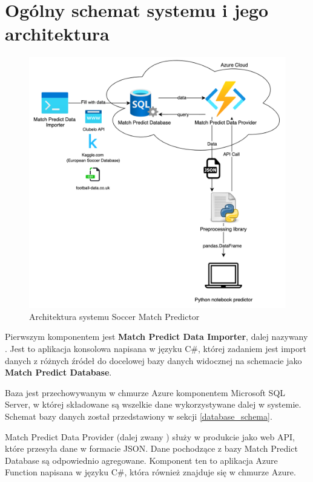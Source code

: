 \section{Ogólny schemat systemu i jego architektura}
\label{arch}
    \begin{figure}[h] 
        \centering\includegraphics[width=\textwidth]{figures/MatchPredictorArchitecture.png}
        \caption{Architektura systemu Soccer Match Predictor}
        \label{fig:arch1}
    \end{figure}
\newpage

\noindent Pierwszym komponentem jest \textbf{Match Predict Data Importer}, dalej nazywany . Jest to aplikacja konsolowa napisana w języku C\#, której zadaniem jest import danych z różnych źródeł do docelowej bazy danych widocznej na schemacie jako \textbf{Match Predict Database}.

Baza jest przechowywanym w chmurze Azure komponentem Microsoft SQL Server, w której składowane są wszelkie dane wykorzystywane dalej w systemie. Schemat bazy danych został przedstawiony w sekcji \ref{database_schema}.

Match Predict Data Provider (dalej zwany ) służy w produkcie jako web API, które przesyła dane w formacie JSON. Dane pochodzące z bazy Match Predict Database są odpowiednio agregowane. Komponent ten to aplikacja Azure Function napisana w języku C\#, która również znajduje się w chmurze Azure.


